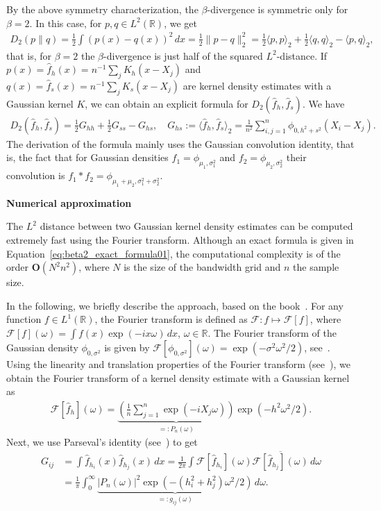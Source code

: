 By the above symmetry characterization, the $\beta$-divergence is symmetric only for $\beta=2$. In this case, for $p,q\in L^2(\mathbb{R})$, we get
\begin{align*}
    D_2(p\|q)=\frac{1}{2}\int(p(x)-q(x))^2\,dx=\frac{1}{2}\|p-q\|_2^2=\frac{1}{2}\langle p,p\rangle_2+\frac{1}{2}\langle q,q\rangle_2-\langle p,q\rangle_2,
\end{align*}
that is, for $\beta=2$ the $\beta$-divergence is just half of the squared $L^2$-distance. If $p(x)=\hat{f}_h(x)=n^{-1}\sum_jK_h(x-X_j)$ and $q(x)=\hat{f}_s(x)=n^{-1}\sum_jK_s(x-X_j)$ are kernel density estimates with a Gaussian kernel $K$, we can obtain an explicit formula for $D_2(\hat{f}_h,\hat{f}_s)$. We have
\begin{align}\label{eq:beta2_exact_formula01}
    D_2(\hat{f}_h,\hat{f}_s)=\frac{1}{2}G_{hh}+\frac{1}{2}G_{ss}-G_{hs},\quad G_{hs}:=\langle\hat{f}_h,\hat{f}_s\rangle_2=\frac{1}{n^2}\sum_{i,j=1}^{n}\phi_{0,h^2+s^2}(X_i-X_j).
\end{align}
The derivation of the formula mainly uses the Gaussian convolution identity, that is, the fact that for Gaussian densities $f_1=\phi_{\mu_1,\sigma_1^2}$ and $f_2=\phi_{\mu_2,\sigma_2^2}$ their convolution is $f_1\ast f_2=\phi_{\mu_1+\mu_2,\sigma_1^2+\sigma_2^2}$.

\textbf{Numerical approximation}

The $L^2$ distance between two Gaussian kernel density estimates can be computed extremely fast using the Fourier transform. Although an exact formula is given in Equation~\eqref{eq:beta2_exact_formula01}, the computational complexity is of the order $\mathbf{O}(N^2n^2)$, where $N$ is the size of the bandwidth grid and $n$ the sample size.

In the following, we briefly describe the approach, based on the book~\cite{plonka_numerical_2018}. For any function $f\in L^1(\mathbb{R})$, the Fourier transform is defined as $\mathcal{F}:f\mapsto\mathcal{F}[f]$, where $\mathcal{F}[f](\omega)=\int f(x)\exp{(-ix\omega)}\,dx$, $\omega\in\mathbb{R}$. The Fourier transform of the Gaussian density $\phi_{0,\sigma^2}$ is given by $\mathcal{F}[\phi_{0,\sigma^2}](\omega)=\exp{(-\sigma^2\omega^2/2)}$, see~\cite[Example~2.6]{plonka_numerical_2018}. Using the linearity and translation properties of the Fourier transform (see~\cite[Theorem~2.5]{plonka_numerical_2018}), we obtain the Fourier transform of a kernel density estimate with a Gaussian kernel as
\begin{align}\label{eq:fourier_transform_of_kde}
    \mathcal{F}[\hat{f}_h](\omega)=\underbrace{\left(\frac{1}{n}\sum_{j=1}^{n}\exp{(-iX_j\omega)}\right)}_{=:P_n(\omega)}\exp{(-h^2\omega^2/2)}.
\end{align}
Next, we use Parseval's identity (see~\cite[Lemma~2.21]{plonka_numerical_2018}) to get
\begin{align*}
    G_{ij}&=\int\hat{f}_{h_i}(x)\hat{f}_{h_j}(x)\,dx=\frac{1}{2\pi}\int\mathcal{F}[\hat{f}_{h_i}](\omega)\overline{\mathcal{F}[\hat{f}_{h_j}](\omega)}\,d\omega\\&
    =\frac{1}{\pi}\int_0^{\infty}\underbrace{|P_n(\omega)|^2\exp{(-(h_i^2+h_j^2)\omega^2/2)}}_{=:g_{ij}(\omega)}\,d\omega.
\end{align*}


